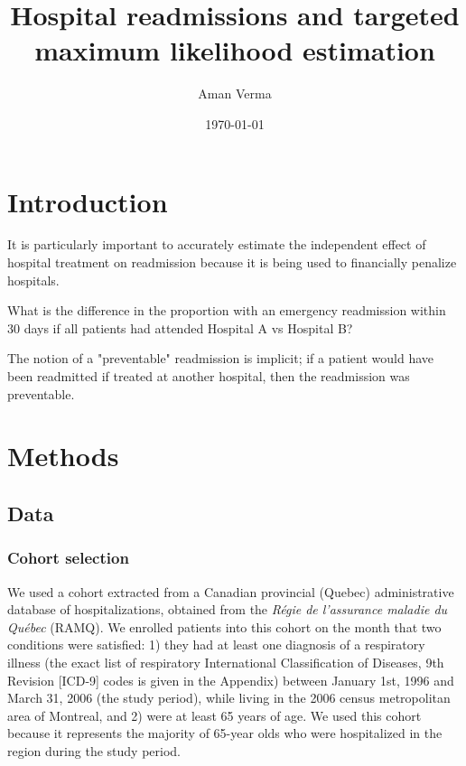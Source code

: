 \documentclass[]{article}
\begin{document}
\title{Hospital readmissions and targeted maximum likelihood estimation}
\author{Aman Verma}
\date{\today}


\section{Introduction}
It is particularly important to accurately estimate the independent effect of hospital treatment on readmission because it is being used to financially penalize hospitals.


What is the difference in the proportion with an emergency readmission within 30 days if all patients had attended Hospital A vs Hospital B? 

The notion of a "preventable" readmission is implicit; if a patient would have been readmitted if treated at another hospital, then the readmission was preventable. 

\section{Methods}

\subsection{Data}

\subsubsection{Cohort selection}
We used a cohort extracted from a Canadian provincial (Quebec) administrative database of hospitalizations, obtained from the \emph{Régie de l'assurance maladie du Québec} (RAMQ). We enrolled patients into this cohort on the month that two conditions were satisfied: 1) they had at least one diagnosis of a respiratory illness (the exact list of respiratory International Classification of Diseases, 9th Revision [ICD-9] codes is given in the Appendix) between January 1st, 1996 and March 31, 2006 (the study period), while living in the 2006 census metropolitan area of Montreal, and 2) were at least 65 years of age. We used this cohort because it represents the majority of 65-year olds who were hospitalized in the region during the study period. 
\end{document}
